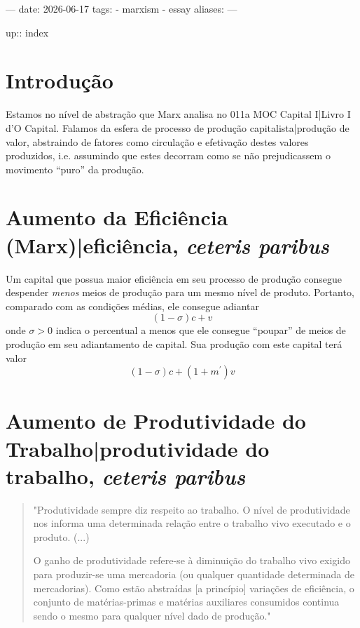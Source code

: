 ---
date: 2026-06-17
tags:
  - marxism
  - essay
aliases:
---

up:: index

\section{Introdução}
Estamos no nível de abstração que Marx analisa no 011a MOC Capital I|Livro I d'O Capital. Falamos da esfera de processo de produção capitalista|produção de valor, abstraindo de fatores como circulação e efetivação destes valores produzidos, i.e. assumindo que estes decorram como se não prejudicassem o movimento ``puro'' da produção. 

\section{Aumento da Eficiência (Marx)|eficiência, \textit{ceteris paribus}}
Um capital que possua maior eficiência em seu processo de produção consegue despender \textit{menos} meios de produção para um mesmo nível de produto. Portanto, comparado com as condições médias, ele consegue adiantar 
$$
(1-\sigma)c + v
$$
onde $\sigma>0$ indica o percentual a menos que ele consegue ``poupar'' de meios de produção em seu adiantamento de capital. Sua produção com este capital terá valor
$$
(1-\sigma)c + (1+m^{\prime})v
$$

\section{Aumento de Produtividade do Trabalho|produtividade do trabalho, \textit{ceteris paribus}}
\begin{quote}
"Produtividade sempre diz respeito ao trabalho. O nível de produtividade nos informa uma determinada relação entre o trabalho vivo executado e o produto. (...)

O ganho de produtividade refere-se à diminuição do trabalho vivo exigido para produzir-se uma mercadoria (ou qualquer quantidade determinada de mercadorias). Como estão abstraídas [a princípio] variações de eficiência, o conjunto de matérias-primas e matérias auxiliares consumidos continua sendo o mesmo para qualquer nível dado de produção." \parencite[p. 233]{SaBarreto2021a}
\end{quote}

